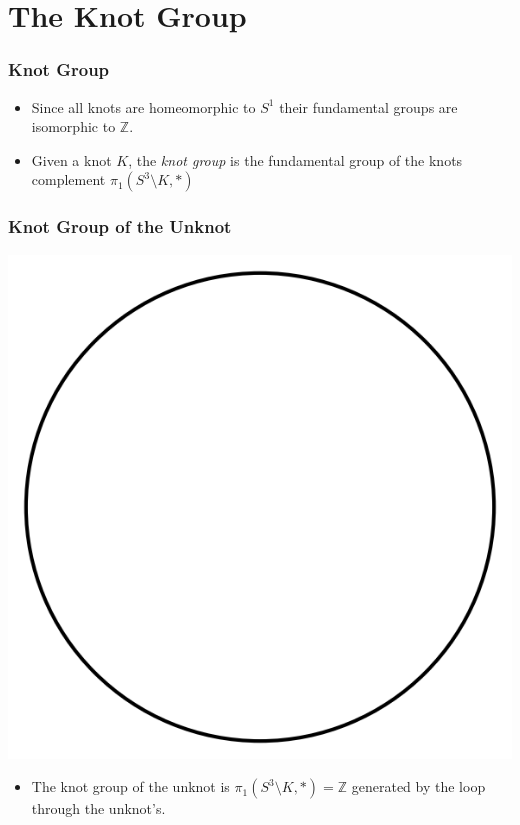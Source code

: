 \documentclass{beamer}
\begin{document}
\section{The Knot Group}

\begin{frame}
  \frametitle{Knot Group}
  \begin{itemize}
  \item Since all knots are homeomorphic to $S^1$ their
    fundamental groups are isomorphic to $\mathbb{Z}$.
    \pause
  \item Given a knot $K$, the \textit{knot group} is
    the fundamental group of the knots complement  $\pi_1(S^3\setminus K,*)$
  \end{itemize}
\end{frame}

\begin{frame}
  \frametitle{Knot Group of the Unknot}
  \begin{center}
    \includegraphics[scale=.3]{unknot}
  \end{center}
  \begin{itemize}
    \pause
  \item The knot group of the unknot is
    $\pi_1(S^3\setminus K,*)=\mathbb{Z}$ generated by the loop through the
    unknot's.
  \end{itemize}
\end{frame}
\end{document}
